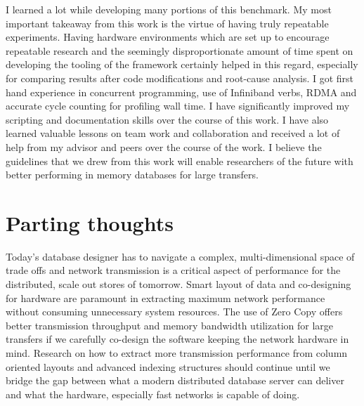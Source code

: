 I learned a lot while developing many portions of this benchmark. My most important takeaway from this work 
is the virtue of having truly repeatable experiments. Having hardware environments which are set up to encourage 
repeatable research and the seemingly disproportionate amount of time spent on developing the tooling of the 
framework certainly helped in this regard, especially for comparing results after code modifications and root-cause analysis.
I got first hand experience in concurrent programming, use of Infiniband verbs, RDMA and accurate cycle counting 
for profiling wall time. I have significantly improved my scripting and documentation skills over the course of this work. 
I have also learned valuable lessons on team work and collaboration and received a lot of help from my 
advisor and peers over the course of the work. I believe the guidelines that we drew from this work will 
enable researchers of the future with better performing in memory databases for large transfers. 

\section{Parting thoughts}
Today's database designer has to navigate a complex, multi-dimensional space of trade offs and network transmission 
is a critical aspect of performance for the distributed, scale out stores of tomorrow. Smart layout of data and  
co-designing for hardware are paramount in extracting maximum network performance without consuming 
unnecessary system resources. The use of Zero Copy offers better transmission throughput and memory bandwidth utilization for 
large transfers if we carefully co-design the software keeping the network hardware in mind. Research on how to extract 
more transmission performance from column oriented layouts and advanced indexing structures should continue until we bridge the 
gap between what a modern distributed database server can deliver and what the hardware, especially fast networks is capable of doing.